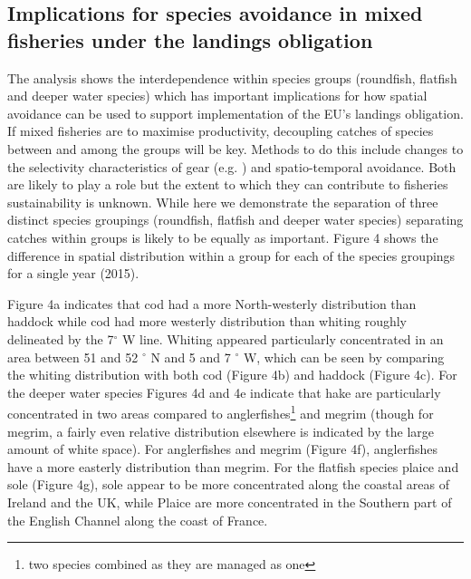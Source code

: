 \documentclass{nature}
\begin{document}
\begin{linenumbers}
[291 words]


\subsection{Implications for species avoidance in mixed fisheries under the
	landings obligation} 
The analysis shows the interdependence within species groups (roundfish,
flatfish and deeper water species) which has important implications for how
spatial avoidance can be used to support implementation of the EU's landings
obligation. If mixed fisheries are to maximise productivity, decoupling catches
of species between and among the groups will be key.  Methods to do this
include changes to the selectivity characteristics of gear (e.g.
\cite{Santos2016}) and spatio-temporal avoidance. Both are likely to play a
role but the extent to which they can contribute to fisheries sustainability is
unknown. While here we demonstrate the separation of three distinct species
groupings (roundfish, flatfish and deeper water species) separating catches
within groups is likely to be equally as important.  Figure 4 shows the
difference in spatial distribution within a group for each of the species
groupings for a single year (2015). 

Figure 4a indicates that cod had a more North-westerly distribution than
haddock while cod had more westerly distribution than whiting roughly
delineated by the 7$^{\circ}$ W line. Whiting appeared particularly
concentrated in an area between 51 and 52 $^{\circ}$ N and 5 and 7 $^{\circ}$
W, which can be seen by comparing the whiting distribution with both cod
(Figure 4b) and haddock (Figure 4c). For the deeper water species Figures 4d and 4e
indicate that hake are particularly concentrated in two areas compared to
anglerfishes\footnote{two species combined as they are managed as one} and
megrim (though for megrim, a fairly even relative distribution elsewhere is
indicated by the large amount of white space). For anglerfishes and megrim
(Figure 4f), anglerfishes have a more easterly distribution than megrim. For
the flatfish species plaice and sole (Figure 4g), sole appear to be more
concentrated along the coastal areas of Ireland and the UK, while Plaice are
more concentrated in the Southern part of the English Channel along the coast
of France.


\end{linenumbers}
\end{document}

